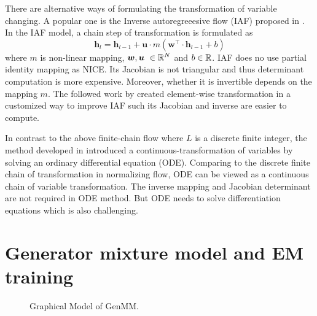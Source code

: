 \begin{remark}
  There are alternative ways of formulating the transformation of variable changing. A popular one is the Inverse autoregreeesive flow (IAF) proposed in \cite{rezende2015variational}. In the IAF model, a chain step of transformation is formulated as
  \begin{equation*}
    \bm{h}_l = \bm{h}_{l-1} + \bm{u} \cdot {m}(\bm{w}^{\intercal} \cdot \bm{h}_{l-1} + b)
  \end{equation*}
  where $m$ is non-linear mapping, $\bm{w}, \bm{u}~\in \mathbb{R}^{N}$ and $b\in \mathbb{R}$. IAF does no use partial identity mapping as NICE. Its Jacobian is not triangular and thus determinant computation is more expensive. Moreover, whether it is invertible depends on the mapping $m$. The followed work by \cite{kingma2016IVF} created element-wise transformation in a customized way to improve IAF such its Jacobian and inverse are easier to compute. 
  
  In contrast to the above finite-chain flow where $L$ is a discrete finite integer, the method developed in \cite{ricky2018ODE} introduced a continuous-transformation of variables by solving an ordinary differential equation (ODE). Comparing to the discrete finite chain of transformation in normalizing flow, ODE can be viewed as a continuous chain of variable transformation. The inverse mapping and Jacobian determinant are not required in ODE method. But ODE needs to solve differentiation equations which is also challenging.
\end{remark}

\section{Generator mixture model and EM training}
\label{chpt6:sec:generator-mix-em}
\begin{figure}[tp!]
  \centering
  \caption{Graphical Model of GenMM.}\label{chpt6:fig:genmm-graph}
\end{figure}

